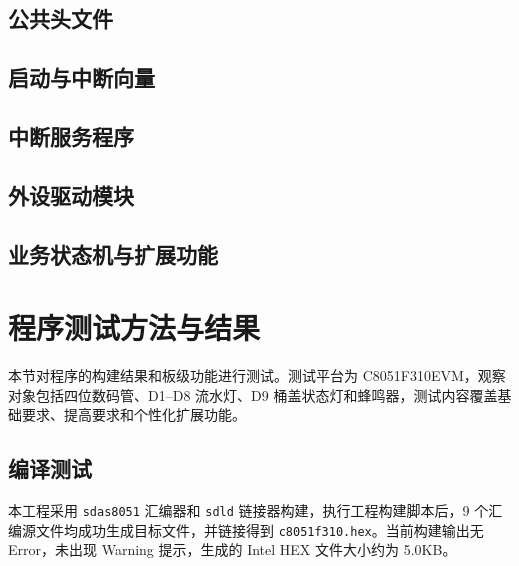 \documentclass[12pt,a4paper]{article}
\begin{document}
\subsection{公共头文件}



\subsection{启动与中断向量}



\subsection{中断服务程序}


\subsection{外设驱动模块}





\subsection{业务状态机与扩展功能}



\section{程序测试方法与结果}
本节对程序的构建结果和板级功能进行测试。测试平台为 C8051F310EVM，观察对象包括四位数码管、D1--D8 流水灯、D9 桶盖状态灯和蜂鸣器，测试内容覆盖基础要求、提高要求和个性化扩展功能。

\subsection{编译测试}
本工程采用 \texttt{sdas8051} 汇编器和 \texttt{sdld} 链接器构建，执行工程构建脚本后，9 个汇编源文件均成功生成目标文件，并链接得到 \texttt{c8051f310.hex}。当前构建输出无 Error，未出现 Warning 提示，生成的 Intel HEX 文件大小约为 5.0KB。
\end{document}
